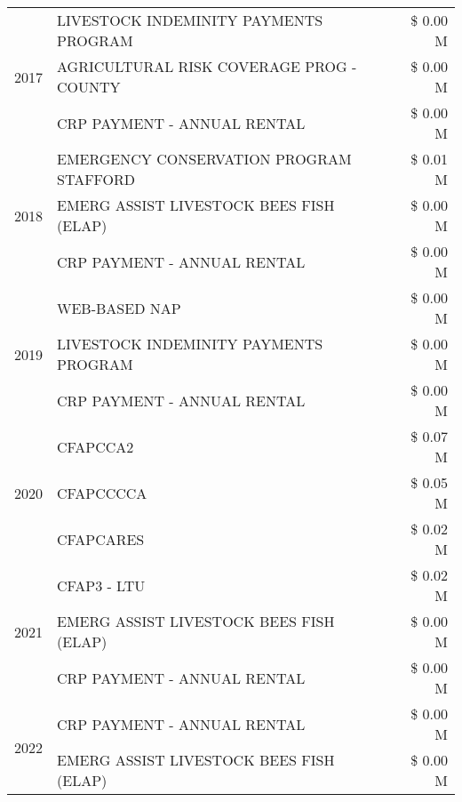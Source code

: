 \begin{tabular}{llr}
\cline{1-3}
\multirow[t]{3}{*}{2017} & LIVESTOCK INDEMINITY PAYMENTS PROGRAM & \$ 0.00 M \\
 & AGRICULTURAL RISK COVERAGE PROG - COUNTY & \$ 0.00 M \\
 & CRP PAYMENT - ANNUAL RENTAL & \$ 0.00 M \\
\cline{1-3}
\multirow[t]{3}{*}{2018} & EMERGENCY CONSERVATION PROGRAM STAFFORD & \$ 0.01 M \\
 & EMERG ASSIST LIVESTOCK BEES FISH (ELAP) & \$ 0.00 M \\
 & CRP PAYMENT - ANNUAL RENTAL & \$ 0.00 M \\
\cline{1-3}
\multirow[t]{3}{*}{2019} & WEB-BASED NAP & \$ 0.00 M \\
 & LIVESTOCK INDEMINITY PAYMENTS PROGRAM & \$ 0.00 M \\
 & CRP PAYMENT - ANNUAL RENTAL & \$ 0.00 M \\
\cline{1-3}
\multirow[t]{3}{*}{2020} & CFAPCCA2 & \$ 0.07 M \\
 & CFAPCCCCA & \$ 0.05 M \\
 & CFAPCARES & \$ 0.02 M \\
\cline{1-3}
\multirow[t]{3}{*}{2021} & CFAP3 - LTU & \$ 0.02 M \\
 & EMERG ASSIST LIVESTOCK BEES FISH (ELAP) & \$ 0.00 M \\
 & CRP PAYMENT - ANNUAL RENTAL & \$ 0.00 M \\
\cline{1-3}
\multirow[t]{2}{*}{2022} & CRP PAYMENT - ANNUAL RENTAL & \$ 0.00 M \\
 & EMERG ASSIST LIVESTOCK BEES FISH (ELAP) & \$ 0.00 M \\
\cline{1-3}
\bottomrule
\end{tabular}
